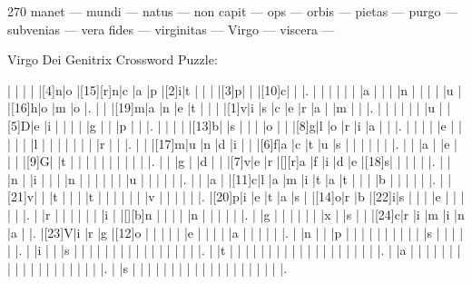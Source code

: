 \documentclass[12pt]{article}
\begin{document}
\pagestyle{fancy}
\fancyhf{}
\renewcommand{\headrulewidth}{0pt}
\renewcommand{\footrulewidth}{0pt}
\libertine
\renewcommand\PuzzleClueFont{\rm\normalsize}
\noindent\begin{rotate}{0}
\small
\end{rotate}
\hfill
\begin{rotate}{270}
\small manet --- mundi --- natus --- non capit --- ops --- orbis --- pietas --- purgo --- subvenias --- vera fides --- virginitas --- Virgo --- viscera --- 
\end{rotate}
\begin{center}
  \huge{Virgo Dei Genitrix Crossword Puzzle:}
\end{center}
\vspace{1.5cm}
\begin{Puzzle}{22}{23}
  |{}  |{}  |{}  |{}  |[4]n|o   |[15][r]n|c   |a   |p   |[2]i|t   |{}  |{}  |{} |[3]p|{}   |{}  |[10]c|{}  |{}  |.
  |{}  |{}  |{}  |{}  |{}  |{}  |a   |{}  |{}  |{}  |n   |{}  |{}  |{}  |{}  |u   |{}  |[16]h|o   |m   |o   |.
  |{}  |{}  |[19]m|a   |n   |e   |t   |{}  |{}  |{}  |[1]v|i   |s   |c   |e   |r   |a   |{}  |m   |{}  |{}  |.
  |{}  |{}  |{}  |{}  |{}  |{}  |u   |{}  |[5]D|e   |i   |{}  |{}  |{}  |{}  |g   |{}  |{}  |p   |{}  |{}  |.
  |{}  |{}  |{}  |{}  |[13]b|{}  |s   |{}  |{}  |{}  |o   |{}  |{}  |[8]g|l   |o   |r   |i   |a   |{}  |{}  |.
  |{}  |{}  |{}  |{}  |e   |{}  |{}  |{}  |{}  |{}  |l   |{}  |{}  |{}  |{}  |{}  |{}  |{}  |r   |{}  |{}  |.
  |{}  |{}  |[17]m|u   |n   |d   |i   |{}  |{}  |[6]f|a   |c   |t   |u   |s   |{}  |{}  |{}  |{}  |{}  |{}  |.
  |{}  |{}  |a   |{}  |e   |{}  |{}  |{}  |[9]G|{}  |t   |{}  |{}  |{}  |{}  |{}  |{}  |{}  |{}  |{}  |{}  |.
  |{}  |{}  |g   |{}  |d   |{}  |{}  |[7]v|e   |r   |[][r]a   |f   |i   |d   |e   |[18]s|{}  |{}  |{}  |{}  |{}  |.
  |{}  |{}  |n   |{}  |i   |{}  |{}  |{}  |n   |{}  |{}  |{}  |{}  |{}  |{}  |u   |{}  |{}  |{}  |{}  |{}  |.
  |{}  |{}  |a   |{}  |[11]c|l   |a   |m   |i   |t   |a   |t   |{}  |{}  |{}  |b   |{}  |{}  |{}  |{}  |{}  |.
  |{}  |[21]v|{}  |{}  |t   |{}  |{}  |{}  |t   |{}  |{}  |{}  |{}  |{}  |{}  |v   |{}  |{}  |{}  |{}  |{}  |.
  |[20]p|i   |e   |t   |a   |s   |{}  |[14]o|r   |b   |[22]i|s   |{}  |{}  |{}  |e   |{}  |{}  |{}  |{}  |{}  |.
  |{}  |r   |{}  |{}  |{}  |{}  |{}  |{}  |i   |{}  |[][b]n   |{}  |{}  |{}  |{}  |n   |{}  |{}  |{}  |{}  |{}  |.
  |{}  |g   |{}  |{}  |{}  |{}  |{}  |{}  |x   |{}  |s   |{}  |{}  |[24]c|r   |i   |m   |i   |n   |a   |{}  |.
  |[23]V|i   |r   |g   |[12]o   |{}  |{}  |{}  |{}  |{}  |e   |{}  |{}  |{}  |{}  |a   |{}  |{}  |{}  |{}  |{}  |.
  |{}  |n   |{}  |{}  |p  |{}  |{}  |{}  |{}  |{}  |{}  |{}  |{}  |{}  |{}  |s   |{}  |{}  |{}  |{}  |{}  |.
  |{}  |i   |{}  |{}  |s  |{}  |{}  |{}  |{}  |{}  |{}  |{}  |{}  |{}  |{}  |{}  |{}  |{}  |{}  |{}  |{}  |.
  |{}  |t   |{}  |{}  |{}  |{}  |{}  |{}  |{}  |{}  |{}  |{}  |{}  |{}  |{}  |{}  |{}  |{}  |{}  |{}  |{}  |.
  |{}  |a   |{}  |{}  |{}  |{}  |{}  |{}  |{}  |{}  |{}  |{}  |{}  |{}  |{}  |{}  |{}  |{}  |{}  |{}  |{}  |.
  |{}  |s   |{}  |{}  |{}  |{}  |{}  |{}  |{}  |{}  |{}  |{}  |{}  |{}  |{}  |{}  |{}  |{}  |{}  |{}  |{}  |.
\end{Puzzle}
\end{document}
